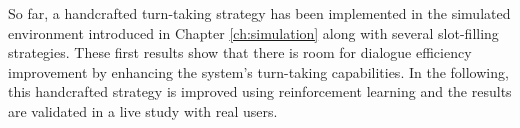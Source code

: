                                  \newpage
        
                                 So far, a handcrafted turn-taking strategy has been implemented in the simulated environment introduced in Chapter \ref{ch:simulation} along with several slot-filling strategies. These first results show that there is room for dialogue efficiency improvement by enhancing the system's turn-taking capabilities. In the following, this handcrafted strategy is improved using reinforcement learning and the results are validated in a live study with real users.
    
